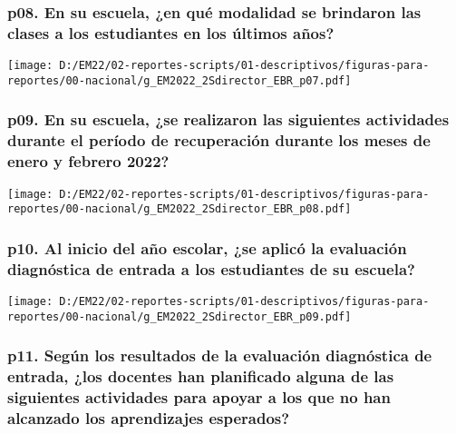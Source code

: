 \documentclass[
]{article}
\begin{document}
\hypertarget{p08.-en-su-escuela-en-quuxe9-modalidad-se-brindaron-las-clases-a-los-estudiantes-en-los-uxfaltimos-auxf1os}{%
\subsubsection{p08. En su escuela, ¿en qué modalidad se brindaron las
clases a los estudiantes en los últimos
años?}\label{p08.-en-su-escuela-en-quuxe9-modalidad-se-brindaron-las-clases-a-los-estudiantes-en-los-uxfaltimos-auxf1os}}

\texttt{[image: D:/EM22/02-reportes-scripts/01-descriptivos/figuras-para-reportes/00-nacional/g\_EM2022\_2Sdirector\_EBR\_p07.pdf]}

\hypertarget{p09.-en-su-escuela-se-realizaron-las-siguientes-actividades-durante-el-peruxedodo-de-recuperaciuxf3n-durante-los-meses-de-enero-y-febrero-2022}{%
\subsubsection{p09. En su escuela, ¿se realizaron las siguientes
actividades durante el período de recuperación durante los meses de
enero y febrero
2022?}\label{p09.-en-su-escuela-se-realizaron-las-siguientes-actividades-durante-el-peruxedodo-de-recuperaciuxf3n-durante-los-meses-de-enero-y-febrero-2022}}

\texttt{[image: D:/EM22/02-reportes-scripts/01-descriptivos/figuras-para-reportes/00-nacional/g\_EM2022\_2Sdirector\_EBR\_p08.pdf]}

\hypertarget{p10.-al-inicio-del-auxf1o-escolar-se-aplicuxf3-la-evaluaciuxf3n-diagnuxf3stica-de-entrada-a-los-estudiantes-de-su-escuela}{%
\subsubsection{p10. Al inicio del año escolar, ¿se aplicó la evaluación
diagnóstica de entrada a los estudiantes de su
escuela?}\label{p10.-al-inicio-del-auxf1o-escolar-se-aplicuxf3-la-evaluaciuxf3n-diagnuxf3stica-de-entrada-a-los-estudiantes-de-su-escuela}}

\texttt{[image: D:/EM22/02-reportes-scripts/01-descriptivos/figuras-para-reportes/00-nacional/g\_EM2022\_2Sdirector\_EBR\_p09.pdf]}

\hypertarget{p11.-seguxfan-los-resultados-de-la-evaluaciuxf3n-diagnuxf3stica-de-entrada-los-docentes-han-planificado-alguna-de-las-siguientes-actividades-para-apoyar-a-los-que-no-han-alcanzado-los-aprendizajes-esperados}{%
\subsubsection{p11. Según los resultados de la evaluación diagnóstica de
entrada, ¿los docentes han planificado alguna de las siguientes
actividades para apoyar a los que no han alcanzado los aprendizajes
esperados?}\label{p11.-seguxfan-los-resultados-de-la-evaluaciuxf3n-diagnuxf3stica-de-entrada-los-docentes-han-planificado-alguna-de-las-siguientes-actividades-para-apoyar-a-los-que-no-han-alcanzado-los-aprendizajes-esperados}}
\end{document}
